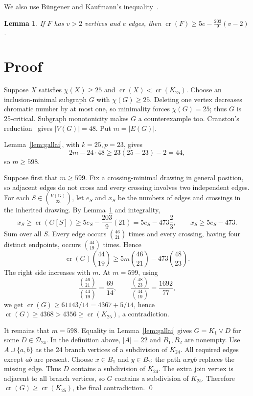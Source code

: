 \documentclass[11pt]{amsart}
\newtheorem{lemma}[theorem]{Lemma}
\newcommand{\crn}{\operatorname{cr}}
\newcommand{\join}{\mathbin{\vee}}
\begin{document}
We also use B\"ungener and Kaufmann's inequality~\cite{BuengenerKaufmann2024}.
\begin{lemma}\label{lem:linear}
If $F$ has $v>2$ vertices and $e$ edges, then
$\crn(F)\geq5e-\frac{203}{9}(v-2)$.
\end{lemma}

\section{Proof}
Suppose $X$ satisfies $\chi(X)\geq25$ and
$\crn(X)<\crn(K_{25})$. Choose an inclusion-minimal subgraph $G$ with
$\chi(G)\geq25$. Deleting one vertex decreases chromatic number by at most
one, so minimality forces $\chi(G)=25$; thus $G$ is 25-critical. Subgraph
monotonicity makes $G$ a counterexample too. Cranston's
reduction~\cite[Theorem~2]{cranston2025progressalbertsonsconjecture} gives $|V(G)|=48$. Put
$m=|E(G)|$.

Lemma~\ref{lem:gallai}, with $k=25,p=23$, gives
\[
 2m-24\cdot48\geq23(25-23)-2=44,
\]
so $m\geq598$.

Suppose first that $m\geq599$. Fix a crossing-minimal drawing in general
position, so adjacent edges do not cross and every crossing involves two
independent edges. For each $S\in\binom{V(G)}{23}$, let $e_S$ and $x_S$ be
the numbers of edges and crossings in the inherited drawing. By
Lemma~\ref{lem:linear} and integrality,
\[
 x_S\geq\crn(G[S])\geq5e_S-\frac{203}{9}(21)
 =5e_S-473\frac23,
 \qquad x_S\geq5e_S-473.
\]
Sum over all $S$. Every edge occurs $\binom{46}{21}$ times and every crossing,
having four distinct endpoints, occurs $\binom{44}{19}$ times. Hence
\begin{equation}\label{eq:doublecount}
 \crn(G)\binom{44}{19}
 \geq5m\binom{46}{21}-473\binom{48}{23}.
\end{equation}
The right side increases with $m$. At $m=599$, using
\[
 \frac{\binom{46}{21}}{\binom{44}{19}}=\frac{69}{14},\qquad
 \frac{\binom{48}{23}}{\binom{44}{19}}=\frac{1692}{77},
\]
we get $\crn(G)\geq61143/14=4367+5/14$, hence
$\crn(G)\geq4368>4356\geq\crn(K_{25})$, a contradiction.

It remains that $m=598$. Equality in Lemma~\ref{lem:gallai} gives
$G=K_1\join D$ for some $D\in\mathcal D_{24}$. In the definition above,
$|A|=22$ and $B_1,B_2$ are nonempty. Use $A\cup\{a,b\}$ as the 24 branch
vertices of a subdivision of $K_{24}$. All required edges except $ab$ are
present. Choose $x\in B_1$ and $y\in B_2$; the path $a x y b$ replaces the
missing edge. Thus $D$ contains a subdivision of $K_{24}$. The extra join
vertex is adjacent to all branch vertices, so $G$ contains a subdivision of
$K_{25}$. Therefore $\crn(G)\geq\crn(K_{25})$, the final contradiction.
\qed
\end{document}
